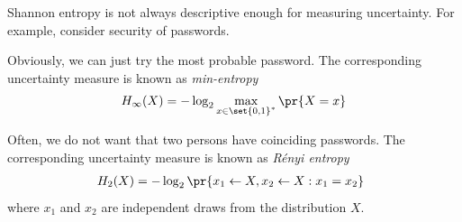 \documentclass[landscape,footrule]{foils}
\begin{document}

Shannon entropy is not always descriptive enough for measuring
uncertainty.  For example, consider security of passwords.
\begin{triangles}
\item Obviously, we can just try the most probable password.  The
  correspond\-ing uncertainty measure is known as \emph{min-entropy}
  \begin{align*}
    H_\infty(X)=-\log_2 \max_{x\in\set{0,1}^*} \pr{X=x}
  \end{align*}
\item Often, we do not want that two persons have coinciding
  passwords. The corresponding uncertainty measure is known as
  \emph{R\'{e}nyi entropy}
  \begin{align*}
    H_2(X)=-\log_2\pr{x_1\gets X, x_2\gets X: x_1=x_2}\enspace
  \end{align*}
  where $x_1$ and $x_2$ are independent draws from the distribution
  $X$.
\end{triangles}
\end{document}
